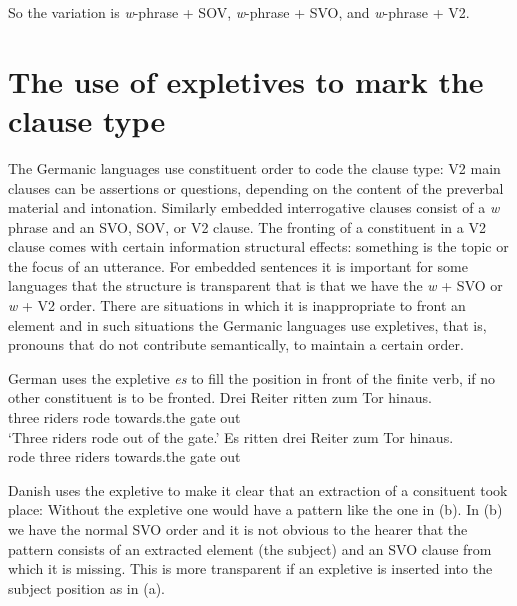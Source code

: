 So the variation is \emph{w}-phrase + SOV, \emph{w}-phrase + SVO, and \emph{w}-phrase + V2.


\section{The use of expletives to mark the clause type}

The Germanic languages use constituent order to code the clause type: V2 main clauses can be
assertions or questions, depending on the content of the preverbal material and
intonation. Similarly embedded interrogative clauses consist of a \emph{w} phrase and an SVO, SOV,
or V2 clause. The fronting of a constituent in a V2 clause comes with certain information structural
effects: something is the topic or the focus of an utterance. For embedded sentences it is important
for some languages that the structure is transparent that is that we have the \emph{w} + SVO or
\emph{w} + V2 order. There are situations in which it is inappropriate to front an element and in
such situations the Germanic languages use expletives, that is, pronouns that do not contribute
semantically, to maintain a certain order.

German uses the expletive \emph{es} to fill the position in front of the finite verb, if no other
constituent is to be fronted.
\eal
\ex 
\gll Drei Reiter ritten zum Tor hinaus.\\
     three riders rode  towards.the gate out\\\german
\glt `Three riders rode out of the gate.'
\ex 
\gll Es ritten drei Reiter zum Tor hinaus.\\
     \expl{} rode   three riders towards.the gate out\\
\zl

Danish uses the expletive to make it clear that an extraction of a consituent took place:
\eal
{}
\zl
Without the expletive one would have a pattern like the one in (b). In (b) we have the
normal SVO order and it is not obvious to the hearer that the pattern consists of an extracted
element (the subject) and an SVO clause from which it is missing. This is more transparent if an
expletive is inserted into the subject position as in (a).

